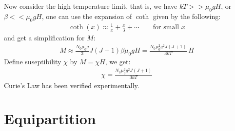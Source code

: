 \documentclass[11pt,oneside]{book}
\theoremstyle{break}
\theoremstyle{break}
\begin{document}
Now consider the high temperature limit, that is, we have $kT >> \mu_0 gH$, or $\beta << \mu_0 gH$, one can use the expansion of $\coth$ given by the following:
\begin{align*}
\coth(x)\approx \frac{1}{x}+ \frac{x}{3}+\cdots \qquad\text{for small }x
\end{align*}
and get a simplification for $M$:
\begin{align*}
M \approx \frac{N_0\mu_0 g}{3}J(J+1) \beta \mu_0 gH = \frac{N_0 \mu_0^2 g^2 J(J+1)}{3kT}\, H
\end{align*}
Define suseptibility $\chi$ by $M = \chi H$, we get:
\begin{align*}
\chi = \frac{N_0 \mu_0^2 g^2 J(J+1)}{3kT} \tag{Curie's Law}
\end{align*}
Curie's Law has been verified experimentally.
\newpage

\chapter{Equipartition}
\end{document}
